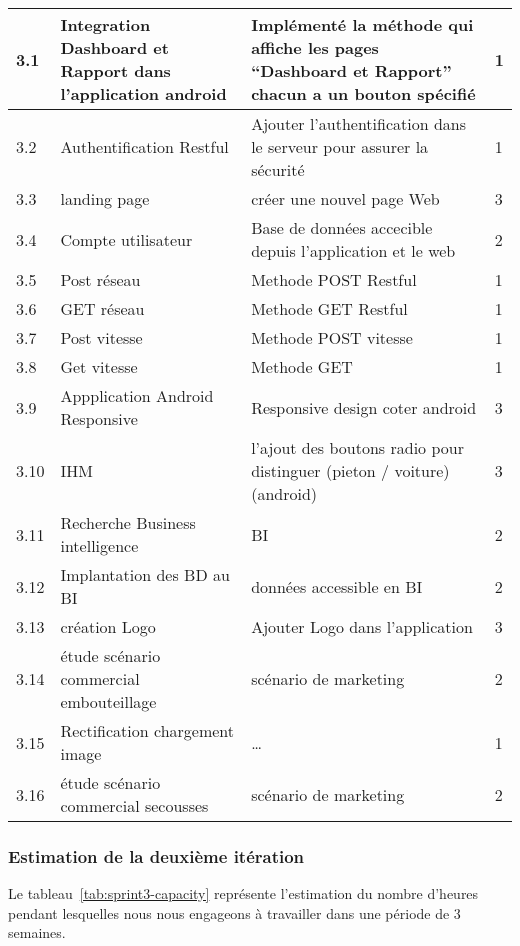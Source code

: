 \begin{center}
\begin{longtable}{| p{1cm} | p{5cm} | p{7cm} | p{1cm} |}
\hline
3.1 & Integration Dashboard et Rapport dans l'application android & Implémenté la méthode qui affiche les pages ``Dashboard et Rapport'' chacun a un bouton spécifié   & 1 \\ \hline
3.2 & Authentification Restful  & Ajouter l'authentification dans le serveur pour assurer la sécurité   & 1 \\ \hline
3.3 & landing page & créer une nouvel page Web  & 3\\ \hline
3.4 & Compte utilisateur & Base de données accecible depuis l'application et le web& 2 \\ \hline
3.5 & Post réseau & Methode POST Restful & 1 \\ \hline
3.6 & GET réseau & Methode GET Restful & 1 \\ \hline
3.7 & Post vitesse & Methode POST vitesse & 1 \\ \hline
3.8 & Get vitesse & Methode GET & 1 \\ \hline
3.9 & Appplication Android Responsive & Responsive design coter android & 3 \\ \hline
3.10 & IHM & l'ajout des boutons radio pour distinguer (pieton / voiture)(android) & 3 \\ \hline
3.11 & Recherche Business intelligence & BI & 2 \\ \hline
3.12 & Implantation des BD au BI & données accessible en BI & 2\\ \hline
3.13 & création Logo &Ajouter Logo dans l'application & 3 \\ \hline
3.14 & étude scénario commercial embouteillage & scénario de marketing& 2\\ \hline
3.15 & Rectification chargement image & \ldots & 1 \\ \hline
3.16 & étude scénario commercial secousses & scénario de marketing& 2\\ \hline
\end{longtable}
\end{center}

\subsubsection{Estimation de la deuxième itération}

Le tableau~\ref{tab:sprint3-capacity} représente l'estimation du nombre
d'heures pendant lesquelles nous nous engageons à travailler dans une période
de 3 semaines.

